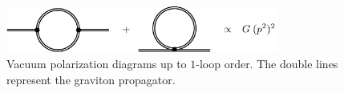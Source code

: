 \begin{figure}[t]
\centering
\includegraphics[width=0.8\textwidth]{figs/TikZ/vacuum_pol}
\caption[Vacuum polarization diagrams up to $1$-loop order.]{Vacuum polarization diagrams up to $1$-loop order. The double lines represent the graviton propagator.}	
\label{fig:vacuum_pol}
\hrulefill
\end{figure}